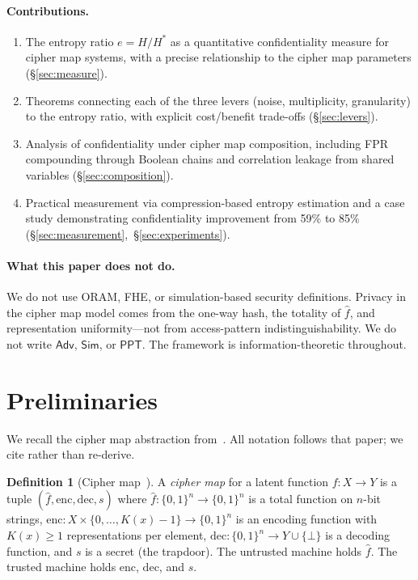\documentclass[11pt]{article}
\theoremstyle{definition}
\newtheorem{definition}{Definition}[section]
\theoremstyle{plain}
\theoremstyle{remark}
\newcommand{\fhat}{\hat{f}}
\newcommand{\enc}{\mathrm{enc}}
\newcommand{\dec}{\mathrm{dec}}
\newcommand{\B}{\{0,1\}}
\begin{document}
\paragraph{Contributions.}
\begin{enumerate}
\item The entropy ratio $e = H/H^*$ as a quantitative confidentiality
  measure for cipher map systems, with a precise relationship to the
  cipher map parameters (\S\ref{sec:measure}).

\item Theorems connecting each of the three levers (noise, multiplicity,
  granularity) to the entropy ratio, with explicit cost/benefit trade-offs
  (\S\ref{sec:levers}).

\item Analysis of confidentiality under cipher map composition, including
  FPR compounding through Boolean chains and correlation leakage from
  shared variables (\S\ref{sec:composition}).

\item Practical measurement via compression-based entropy estimation and
  a case study demonstrating confidentiality improvement from 59\% to
  85\% (\S\ref{sec:measurement},~\S\ref{sec:experiments}).
\end{enumerate}

\paragraph{What this paper does not do.}
We do not use ORAM, FHE, or simulation-based security definitions.
Privacy in the cipher map model comes from the one-way hash, the totality
of $\fhat$, and representation uniformity---not from access-pattern
indistinguishability.  We do not write $\mathsf{Adv}$, $\mathsf{Sim}$,
or $\mathsf{PPT}$.  The framework is information-theoretic throughout.


\section{Preliminaries}
\label{sec:prelim}

We recall the cipher map abstraction from~\cite{towell2026cipher}.  All
notation follows that paper; we cite rather than re-derive.

\begin{definition}[Cipher map~{\cite[Def.~3.1]{towell2026cipher}}]
\label{def:cipher-map}
A \emph{cipher map} for a latent function $f : X \to Y$ is a tuple
$(\fhat, \enc, \dec, s)$ where $\fhat : \B^n \to \B^n$ is a total
function on $n$-bit strings, $\enc : X \times \{0,\ldots,K(x){-}1\}
\to \B^n$ is an encoding function with $K(x) \geq 1$ representations
per element, $\dec : \B^n \to Y \cup \{\bot\}$ is a decoding function,
and $s$ is a secret (the trapdoor).  The untrusted machine holds $\fhat$.
The trusted machine holds $\enc$, $\dec$, and $s$.
\end{definition}
\end{document}
